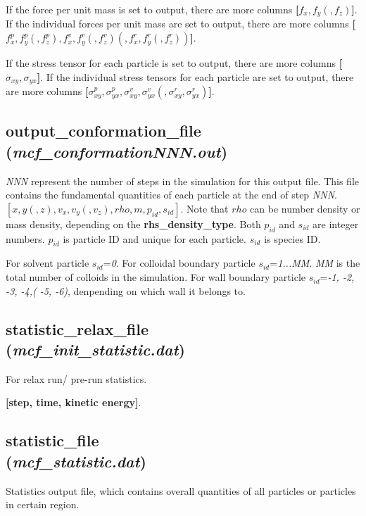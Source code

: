 \documentclass[a4paper,10pt]{article}
\begin{document}
If the force per unit mass is set to output,
there are more columns
\textbf{[$f_x, f_y(, f_z)$]}.
If the individual forces per unit mass are set to output,
there are more columns
\textbf{[$f^p_x, f^p_y(, f^p_z),f^v_x, f^v_y(, f^v_z)(,f^r_x, f^r_y(, f^r_z))$]}.


If the stress tensor for each particle is set to output,
there are more columns
\textbf{[$\sigma_{xy}, \sigma_{yx}$]}.
If the individual stress tensors for each particle are set to output,
there are more columns
\textbf{[$\sigma^p_{xy}, \sigma^p_{yx}, \sigma^v_{xy}, \sigma^v_{yx}(,\sigma^r_{xy}, \sigma^r_{yx})$]}.


\subsection{\textbf{output\_conformation\_file}\\
(\textit{mcf\_conformationNNN.out})}
\textit{NNN} represent the number of steps in the simulation for this output file.
This file contains the fundamental quantities of each particle
at the end of step \textit{NNN}.
\textbf{$[x, y(, z), v_x, v_y(, v_z), rho, m, p_{id}, s_{id}]$}.
Note that \textbf{$rho$} can be number density or mass density,
depending on the \textbf{rhs\_density\_type}.
Both \textbf{$p_{id}$} and \textbf{$s_{id}$} are integer numbers.
\textbf{$p_{id}$} is particle ID and
unique for each particle.
\textbf{$s_{id}$} is species ID.

For solvent particle \textbf{$s_{id}$}=\textit{0}.
For colloidal boundary particle \textbf{$s_{id}$}=\textit{1...\textit{MM}}.
\textit{MM} is the total number of colloids
in the simulation.
For wall boundary particle \textbf{$s_{id}$}=\textit{-1, -2, -3, -4,( -5, -6)},
denpending on which wall it belongs to.


\subsection{\textbf{statistic\_relax\_file}\\
(\textit{mcf\_init\_statistic.dat})}
For relax run/ pre-run statistics.

\textbf{[step, time, kinetic energy]}.

\subsection{\textbf{statistic\_file}\\
(\textit{mcf\_statistic.dat})}
Statistics output file,
which contains overall quantities of all particles
or particles in certain region.
\end{document}
